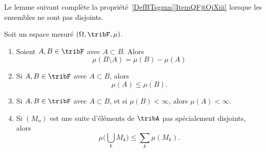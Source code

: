 Le lemme suivant complète la propriété~\ref{DefBTsgznn}\ref{ItemQFjtOjXiii} lorsque les ensembles ne sont pas disjoints.
\begin{lemma} \label{LemPMprYuC}
	Soit un espace mesuré \( (\Omega,\tribF,\mu)\).
	\begin{enumerate}
		\item       \label{ITEMooSUIRooNDVOoB}
		      Soient \( A,B\in\tribF\) avec \( A\subset B\). Alors
		      \begin{equation}
			      \mu(B\setminus A)=\mu(B)-\mu(A)
		      \end{equation}
		\item       \label{ITEMooLEGKooWnYmlf}
		      Si \( A,B\in \tribF\) avec \( A\subset B\), alors
		      \begin{equation}
			      \mu(A)\leq \mu(B).
		      \end{equation}
		\item       \label{ITEMooMCNBooRGVGqA}
		      Si \( A,B\in \tribF\) avec \( A\subset B\), et si \( \mu(B)<\infty\), alors \( \mu(A)<\infty\).
		\item       \label{ITEMooABPYooFQEzqE}
		      Si \( (M_n)\) est une suite d'éléments de \( \tribA\) pas spécialement disjoints, alors
		      \begin{equation}\label{EqWWFooYPCTt}
			      \mu\big( \bigcup_kM_k \big)\leq \sum_{k}\mu(M_k).
		      \end{equation}
	\end{enumerate}
\end{lemma}

